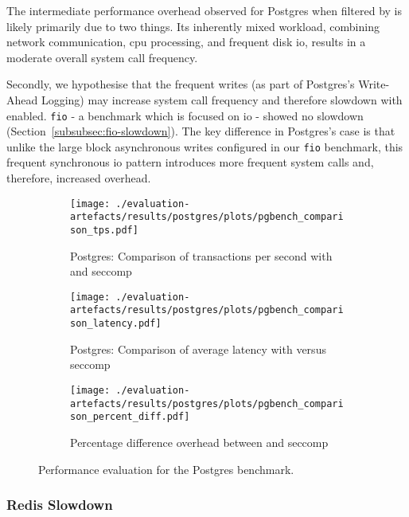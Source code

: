 The intermediate performance overhead observed for Postgres when filtered
by \af is likely primarily due to two things. Its inherently mixed
workload, combining network communication, \ac{cpu} processing, and frequent
disk \ac{io}, results in a moderate overall system call frequency. 

Secondly, we hypothesise that the frequent writes (as part of Postgres's
Write-Ahead Logging) may increase system call frequency and therefore slowdown
with \af enabled. \texttt{fio} - a benchmark which is focused on \ac{io} -
showed no slowdown (Section~\ref{subsubsec:fio-slowdown}). The key difference in
Postgres's case is that unlike the large block asynchronous writes
configured in our \texttt{fio} benchmark, this frequent synchronous \ac{io}
pattern introduces more frequent system calls and, therefore, increased overhead.

\begin{figure}[htbp]
    \centering
    \begin{subfigure}[b]{0.45 \textwidth}
        \centering
        \texttt{[image: ./evaluation-artefacts/results/postgres/plots/pgbench\_comparison\_tps.pdf]} 
        \caption{Postgres: Comparison of transactions per second with \af
        and seccomp}
        \label{fig:pgs-txs}
    \end{subfigure}
    \hfill
     \begin{subfigure}[b]{0.45 \textwidth}
        \centering
        \texttt{[image: ./evaluation-artefacts/results/postgres/plots/pgbench\_comparison\_latency.pdf]} 
        \caption{Postgres: Comparison of average latency with \af versus
        seccomp}
        \label{fig:pgs-time}
    \end{subfigure}
     \medskip 
     \begin{subfigure}[b]{0.45 \textwidth}
        \centering
        \texttt{[image: ./evaluation-artefacts/results/postgres/plots/pgbench\_comparison\_percent\_diff.pdf]} %
        \caption{Percentage difference overhead between \af and seccomp}
        \label{fig:pgs-percdiff}
    \end{subfigure}

    \caption{Performance evaluation for the Postgres benchmark.}
    \label{fig:pgs-perf}
\end{figure}

\subsubsection{Redis Slowdown}\label{subsubsec:redis-slowdown}

